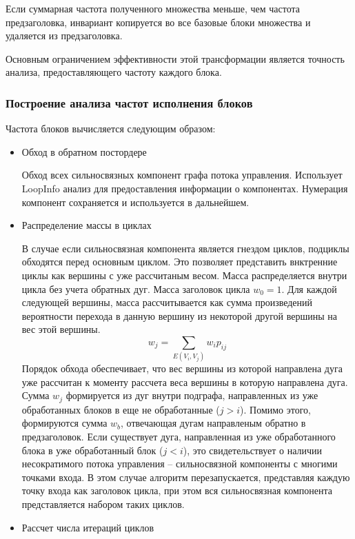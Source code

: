 Если суммарная частота полученного множества меньше, чем частота предзаголовка, инвариант копируется во все базовые блоки множества и удаляется из предзаголовка.

Основным ограничением эффективности этой трансформации является точность анализа, предоставляющего частоту каждого блока.

\subsubsection{Построение анализа частот исполнения блоков}

Частота блоков вычисляется следующим образом:
\begin{itemize}
    \item{Обход в обратном постордере}

        Обход всех сильносвязных компонент графа потока управления. Использует LoopInfo анализ для предоставления информации о компонентах. Нумерация компонент сохраняется и используется в дальнейшем.

    \item{Распределение массы в циклах}

        В случае если сильносвязная компонента является гнездом циклов, подциклы обходятся перед основным циклом.
        Это позволяет представить внктренние циклы как вершины с уже рассчитаным весом.
        Масса распределяется внутри цикла без учета обратных дуг.
        Масса заголовок цикла $w_0 = 1$. Для каждой следующей вершины, масса рассчитывается как сумма произведений вероятности перехода в данную вершину из некоторой другой вершины на вес этой вершины.
        $$ w_j = \sum_{E(V_i, V_j)} w_i p_{ij} $$
        Порядок обхода обеспечивает, что вес вершины из которой направлена дуга уже рассчитан к моменту рассчета веса вершины в которую направлена дуга.
        Сумма $ w_j $ формируется из дуг внутри подграфа, направленных из уже обработанных блоков в еще не обработанные ($j > i$).
        Помимо этого, формируются сумма $ w_b $, отвечающая дугам направленым обратно в предзаголовок.
        Если существует дуга, направленная из уже обработанного блока в уже обработанный блок ($ j < i $), это свидетельствует о наличии несократимого потока управления -- сильносвязной компоненты с многими точками входа.
        В этом случае алгоритм перезапускается, представляя каждую точку входа как заголовок цикла, при этом вся сильносвязная компонента представляется набором таких циклов.

    \item{Рассчет числа итераций циклов}


\end{itemize}
